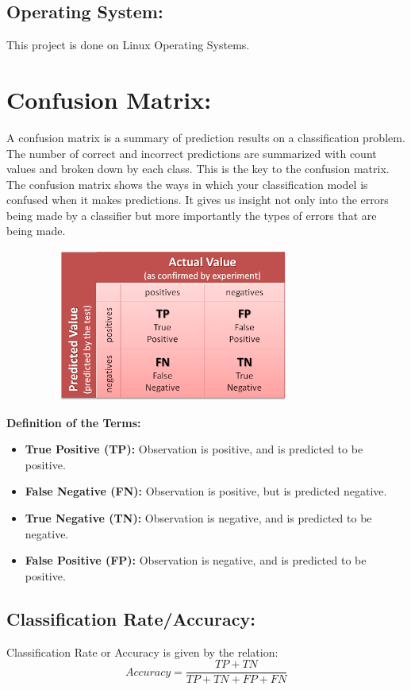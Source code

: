 \documentclass{report}
\begin{document}
\subsection{Operating System: }
This project is done on Linux Operating Systems.


\section{Confusion Matrix: }
A confusion matrix\cite{Confusion Matrix} is a summary of prediction results on a classification problem.
The number of correct and incorrect predictions are summarized with count values and broken down by each class. This is the key to the confusion matrix.
The confusion matrix shows the ways in which your classification model is confused when it makes predictions.
It gives us insight not only into the errors being made by a classifier but more importantly the types of errors that are being made.

\begin{figure}[htbp]
\centering
\includegraphics[height=5cm, width=9cm]{Pictures/confusion_matrix.png}
\caption{}
\label{}
\end{figure}

\textbf{Definition of the Terms: }
\begin{itemize}
\item \textbf{True Positive (TP):} Observation is positive, and is predicted to be positive.
\item \textbf{False Negative (FN):} Observation is positive, but is predicted negative.
\item \textbf{True Negative (TN):} Observation is negative, and is predicted to be negative.
\item \textbf{False Positive (FP):} Observation is negative, and is predicted to be positive.
\end{itemize}

\subsection{Classification Rate/Accuracy:}
Classification Rate or Accuracy is given by the relation:
\[Accuracy = \frac{TP + TN}{TP + TN + FP + FN}\]
\end{document}
